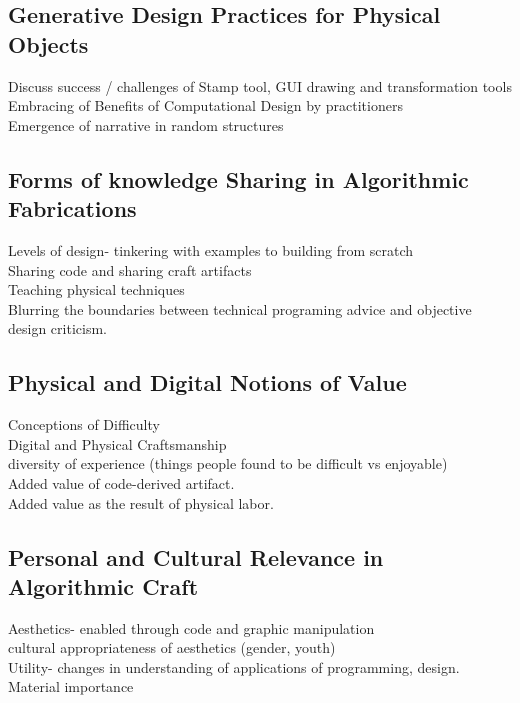 \documentclass{sigchi}
\begin{document}
\subsection{Generative Design Practices for Physical Objects}
Discuss success / challenges of Stamp tool, GUI drawing and transformation tools\\
Embracing of Benefits of Computational Design by practitioners\\
Emergence of narrative in random structures

\subsection{Forms of knowledge Sharing in Algorithmic Fabrications}
Levels of design- tinkering with examples to building from scratch\\
Sharing code and sharing craft artifacts\\
Teaching physical techniques\\
Blurring the boundaries between technical programing advice and objective design criticism.

\subsection{Physical and Digital Notions of Value}
Conceptions of Difficulty\\
Digital and Physical Craftsmanship\\
diversity of experience (things people found to be difficult vs enjoyable)\\
Added value of code-derived artifact.\\
Added value as the result of physical labor.

\subsection{Personal and Cultural Relevance in Algorithmic Craft}
Aesthetics- enabled through code and graphic manipulation\\
cultural appropriateness of aesthetics (gender, youth)\\
Utility- changes in understanding of applications of programming, design.
Material importance
\end{document}
